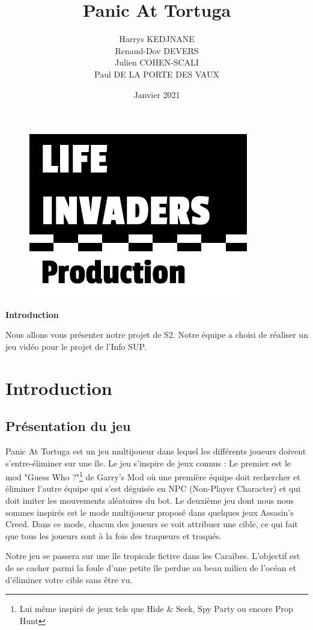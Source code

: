 \documentclass[french, 12pt]{article}
\title{\fontfamily{phv}\selectfont \Huge \textbf{Panic At Tortuga}}
\author{
    \fontfamily{phv}\selectfont
    \vspace{15pt}
    Harrys KEDJNANE\\
    \vspace{15pt}
    \fontfamily{phv}\selectfont
    Renaud-Dov DEVERS\\
    \vspace{15pt}
    \fontfamily{phv}\selectfont
    Julien COHEN-SCALI\\
    \fontfamily{phv}\selectfont
    Paul DE LA PORTE DES VAUX\\
    
}
\date{\fontfamily{phv}\selectfont Janvier 2021}
\begin{document}
\begin{titlepage}
    \maketitle
    \thispagestyle{empty}
    \vspace{20pt}
    \begin{figure}[hbt!]
        \centering
        \includegraphics[scale=0.7]{logo_lifeinvaders_copie.png}
    \end{figure}
\end{titlepage}

\begin{center}
    \textbf{Introduction}

    Nous allons vous présenter notre projet de S2.
    Notre équipe a choisi de réaliser un jeu vidéo pour le projet de l'Info SUP.
\end{center}

\tableofcontents
\newpage

\section{Introduction}
\subsection{Présentation du jeu}
\begin{flushleft}
    Panic At Tortuga est un jeu multijoueur dans lequel les différents joueurs doivent s'entre-éliminer sur une île.
    Le jeu s'inspire de jeux connus : Le premier est le mod "Guess Who ?"\footnote{Lui même inspiré de jeux tels que Hide \& Seek, Spy Party ou encore Prop Hunt} de Garry's Mod
        où une première équipe doit rechercher et éliminer l'autre équipe qui s'est déguisée en NPC (Non-Player Character) et qui doit imiter les mouvements aléatoires du bot.
    Le deuxième jeu dont nous nous sommes inspirés est le mode multijoueur proposé dans quelques jeux Assasin's Creed.
    Dans ce mode, chacun des joueurs se voit attribuer une cible, ce qui fait que tous les joueurs sont à la fois des traqueurs et traqués.

    Notre jeu se passera sur une île tropicale fictive dans les Caraïbes.
    L'objectif est de se cacher parmi la foule d'une petite île perdue au beau milieu de l'océan et d'éliminer votre cible sans être vu.
\end{flushleft}
\end{document}

